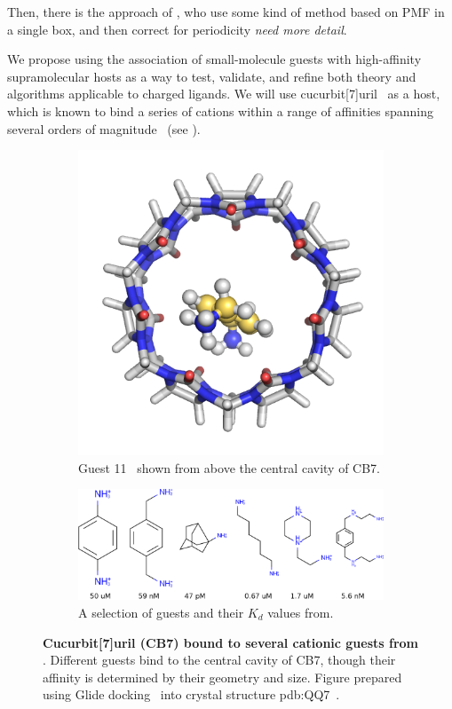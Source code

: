 \documentclass[10pt,final]{article}
\begin{document}
Then, there is the approach of \textcite{Lin2014a}, who use some kind of method based on PMF in a single box, and then correct for periodicity \emph{need more detail}. 

We propose using the association of small-molecule guests with high-affinity supramolecular hosts as a way to test, validate, and refine both theory and algorithms applicable to charged ligands. We will use cucurbit[7]uril~\cite{Lagona2005a} as a host, which is known to bind a series of cations within a range of affinities spanning several orders of magnitude~\cite{Cao2013a} (see ).

\begin{figure}
\centering
\begin{subfigure}{.5\textwidth}
  \centering
  \includegraphics[width=.4\linewidth]{figures/guest11_top.png}
  \caption{Guest 11~\cite{Cao2013a} shown from above the central cavity of CB7.}
  \label{fig:sub1}
\end{subfigure}%
\begin{subfigure}{.5\textwidth}
  \centering
  \includegraphics[width=0.95\linewidth]{figures/Kd_guest.png}  
  \caption{A selection of guests and their $K_d$ values from\textcite{Cao2013a}.}
  \label{fig:sub2}
\end{subfigure}
\caption{\textbf{Cucurbit[7]uril (CB7) bound to several cationic guests from \textcite{Cao2013a}}. Different guests bind to the central cavity of CB7, though their affinity is determined by their geometry and size. Figure prepared using Glide docking~\cite{Halgren2004a,Friesner2004a,Friesner2006a,Schroedinger2014a} into crystal structure pdb:QQ7~\cite{Feng2004a}.}
\label{figure:host-guest}
\end{figure}
\end{document}
